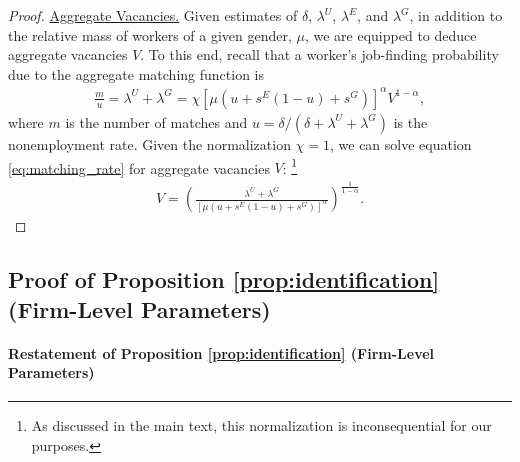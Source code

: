 \begin{proof}
    \uline{Aggregate Vacancies.} %
    Given estimates of $\delta$, $\lambda^{U}$, $\lambda^{E}$, and $\lambda^{G}$, in addition to the relative mass of workers of a given gender, $\mu$, we are equipped to deduce aggregate vacancies $V$. To this end, recall that a worker's job-finding probability due to the aggregate matching function is
    \begin{align}
        \frac{m}{u} = \lambda^{U} + \lambda^{G} = \chi \left[ \mu \left( u + s^{E} (1 - u) + s^{G} \right) \right]^{\alpha} V^{1-\alpha}, \label{eq:matching_rate}
    \end{align}
    where $m$ is the number of matches and $u = \delta / (\delta + \lambda^{U} + \lambda^{G})$ is the nonemployment rate. Given the normalization $\chi = 1$, we can solve equation \eqref{eq:matching_rate} for aggregate vacancies $V$:%
    \footnote{As discussed in the main text, this normalization is inconsequential for our purposes.}
    \begin{align}
        V = \left( \frac{ \lambda^{U} + \lambda^{G}}{\left[ \mu \left( u + s^{E} (1 - u) + s^{G} \right) \right]^{\alpha}} \right)^{\frac{1}{1-\alpha}}. \label{eq:aggregate_V}
    \end{align}
\end{proof}


\subsection{Proof of Proposition \ref{prop:identification} (Firm-Level Parameters)\label{app:proof_firm_level_params}}

\paragraph{Restatement of Proposition \ref{prop:identification} (Firm-Level Parameters)}

